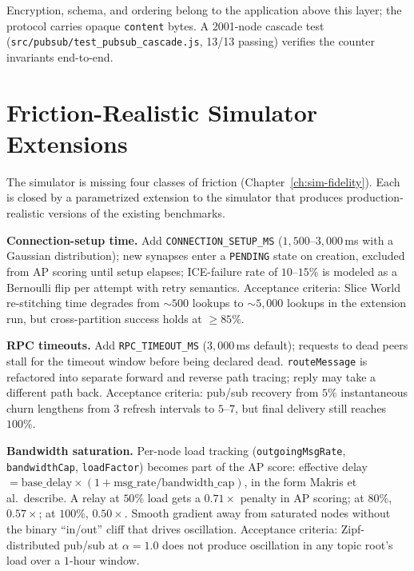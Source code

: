 \documentclass[twoside,nobib]{tufte-book}
\begin{document}
Encryption, schema, and ordering belong to the application
above this layer; the protocol carries opaque \texttt{content}
bytes. A 2001-node cascade test
(\texttt{src/pubsub/test\_pubsub\_cascade.js}, 13/13 passing)
verifies the counter invariants end-to-end.

\section{Friction-Realistic Simulator Extensions}
\label{sec:production-friction}

The simulator is missing four classes of friction
(Chapter~\ref{ch:sim-fidelity}). Each is closed by a
parametrized extension to the simulator that produces
production-realistic versions of the existing benchmarks.

\textbf{Connection-setup time.} Add
\texttt{CONNECTION\_SETUP\_MS} ($1{,}500$--$3{,}000$\,ms with a
Gaussian distribution); new synapses enter a \texttt{PENDING}
state on creation, excluded from AP scoring until setup
elapses; ICE-failure rate of $10$--$15\%$ is modeled as a
Bernoulli flip per attempt with retry semantics.
Acceptance criteria: Slice World re-stitching time degrades
from $\sim 500$ lookups to $\sim 5{,}000$ lookups in the
extension run, but cross-partition success holds at $\geq
85\%$.

\textbf{RPC timeouts.} Add \texttt{RPC\_TIMEOUT\_MS}
($3{,}000$\,ms default); requests to dead peers stall for the
timeout window before being declared dead.
\texttt{routeMessage} is refactored into separate forward and
reverse path tracing; reply may take a different path back.
Acceptance criteria: pub/sub recovery from $5\%$ instantaneous
churn lengthens from $3$ refresh intervals to $5$--$7$, but
final delivery still reaches $100\%$.

\textbf{Bandwidth saturation.} Per-node load tracking
(\texttt{outgoingMsgRate}, \texttt{bandwidthCap},
\texttt{loadFactor}) becomes part of the AP score: effective
delay $= \mathrm{base\_delay} \times (1 + \mathrm{msg\_rate} /
\mathrm{bandwidth\_cap})$, in the form Makris et al.\ describe.
A relay at $50\%$ load gets a $0.71\times$ penalty in AP scoring;
at $80\%$, $0.57\times$; at $100\%$, $0.50\times$. Smooth
gradient away from saturated nodes without the binary
``in/out'' cliff that drives oscillation. Acceptance criteria:
Zipf-distributed pub/sub at $\alpha = 1.0$ does not produce
oscillation in any topic root's load over a $1$-hour window.
\end{document}
